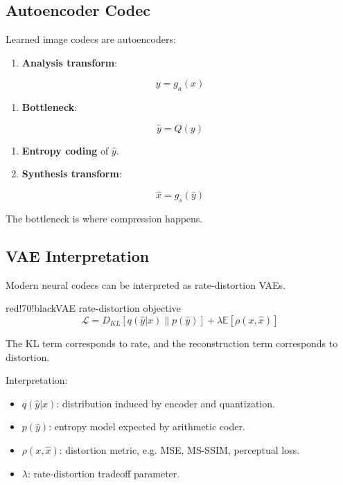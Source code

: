 \subsection{Autoencoder Codec}

Learned image codecs are autoencoders:

\begin{enumerate}
  \item \textbf{Analysis transform}:
\end{enumerate}

\[
y=g_a(x)
\]

\begin{enumerate}
  \item \textbf{Bottleneck}:
\end{enumerate}

\[
\hat{y}=Q(y)
\]

\begin{enumerate}
  \item \textbf{Entropy coding} of $\hat{y}$.
  \item \textbf{Synthesis transform}:
\end{enumerate}

\[
\hat{x}=g_s(\hat{y})
\]

The bottleneck is where compression happens.

\subsection{VAE Interpretation}

Modern neural codecs can be interpreted as rate-distortion VAEs.

\begin{calloutbox}{red!70!black}{VAE rate-distortion objective}
\[
\mathcal{L}
=
D_{KL}[q(\hat{y}|x)\|p(\hat{y})]
+
\lambda\mathbb{E}[\rho(x,\hat{x})]
\]

The KL term corresponds to rate, and the reconstruction term corresponds to distortion.
\end{calloutbox}

Interpretation:

\begin{itemize}
  \item $q(\hat{y}|x)$: distribution induced by encoder and quantization.
  \item $p(\hat{y})$: entropy model expected by arithmetic coder.
  \item $\rho(x,\hat{x})$: distortion metric, e.g. MSE, MS-SSIM, perceptual loss.
  \item $\lambda$: rate-distortion tradeoff parameter.
\end{itemize}

